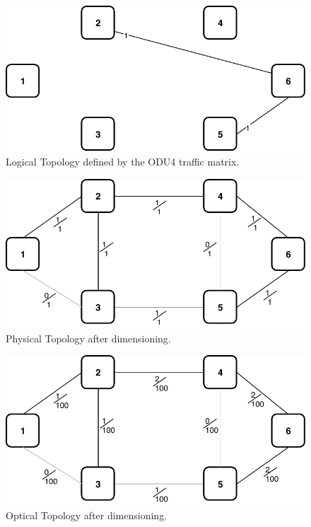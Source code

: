 \begin{figure}[h!]
\centering
\includegraphics[width=12cm]{sdf/ilp/opaque_survivability/figures/logical_topology_ODU4_low}
\caption{Logical Topology defined by the ODU4 traffic matrix.}
\label{logical_ODU4_low}
\end{figure}

\begin{figure}[h!]
\centering
\includegraphics[width=12cm]{sdf/ilp/opaque_survivability/figures/physical_topology_low}
\caption{Physical Topology after dimensioning.}
\label{physical_low}
\end{figure}

\begin{figure}[h!]
\centering
\includegraphics[width=13cm]{sdf/ilp/opaque_survivability/figures/optical_topology_low}
\caption{Optical Topology after dimensioning.}
\label{optical_low}
\end{figure}

